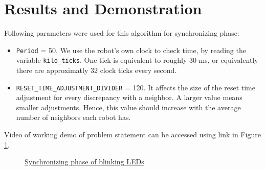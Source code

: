 \section{Results and Demonstration}
Following parameters were used for this algorithm for synchronizing phase:
\begin{itemize}
\item \texttt{Period} = 50. We use the robot's own clock to check time, by reading the variable \texttt{kilo\_ticks}. One tick is equivalent to roughly 30 ms, or equivalently there are approximatly 32 clock ticks every second.
\item \texttt{RESET\_TIME\_ADJUSTMENT\_DIVIDER} = 120. It affects the size of the reset time adjustment for every discrepancy with a neighbor. A larger value means smaller adjustments. Hence, this value should increase with the average number of neighbors each robot has.
\end{itemize}
Video of working demo of problem statement can be accessed using link in Figure \ref{fig:sync_lights}.
\begin{figure}[H]
	\centering
	\caption{\href{https://photos.app.goo.gl/nvWXb5ziksYnx73s6}{Synchronizing phase of blinking LEDs}}
	\label{fig:sync_lights}
\end{figure}
